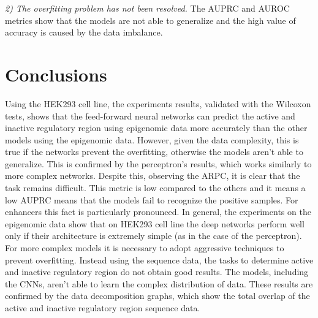 \emph{2) The overfitting problem has not been resolved.} The AUPRC and
AUROC metrics show that the models are not able to generalize and the
high value of accuracy is caused by the data imbalance.

\section{Conclusions}

Using the HEK293 cell line, the experiments results, validated with the
Wilcoxon tests, shows that the feed-forward neural networks can
predict the active and inactive regulatory region using epigenomic data more accurately than the other models using the epigenomic data. However, given the data
complexity, this is true if the networks prevent the overfitting,
otherwise the models aren't able to generalize. This is confirmed by the
perceptron's results, which works similarly to more complex networks.
Despite this, observing the ARPC, it is clear that the task remains difficult. This metric is low compared to the others and it means a low AUPRC means that the models fail to recognize the positive samples. 
For enhancers this fact is particularly pronounced.
In general, the experiments on the epigenomic data show that on HEK293 cell line the deep networks perform well only if their architecture is extremely simple (as in the case of the perceptron). For more complex models it is necessary to adopt aggressive techniques to prevent overfitting.
Instead using the sequence data, the tasks to determine active and
inactive regulatory region do not obtain good results. The models,
including the CNNs, aren't able to learn the complex distribution of
data. These results are confirmed by the data decomposition graphs, which show the total overlap of the active and inactive regulatory region sequence data.